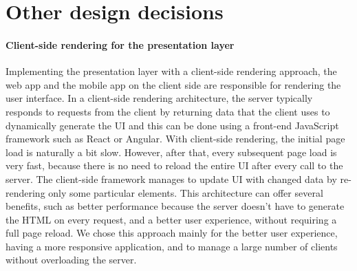 \section{Other design decisions}
\paragraph{Client-side rendering for the presentation layer}
Implementing the presentation layer with a client-side rendering approach, the web app and the mobile app on the client side are responsible for rendering the user interface.
In a client-side rendering architecture, the server typically responds to requests from the client by returning data that the client uses to dynamically generate the UI and this can be done using a front-end JavaScript framework such as React or Angular.
With client-side rendering, the initial page load is naturally a bit slow. However, after that, every subsequent page load is very fast, because there is no need to reload the entire UI after every call to the server. The client-side framework manages to update UI with changed data by re-rendering only some particular elements. This architecture can offer several benefits, such as better performance because the server doesn't have to generate the HTML on every request, and a better user experience, without requiring a full page reload.
We chose this approach mainly for the better user experience, having a more responsive application, and to manage a large number of clients without overloading the server. 

